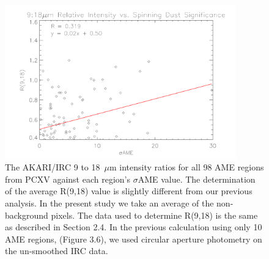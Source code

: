 \begin{figure}[!htb]
\label{fig:R918PlotB}
\centering
\includegraphics[angle=0,width=100mm]{EPS/IRCratio_vs_AMEsigma_betafix.pdf}
\caption{The AKARI/IRC 9 to 18~$\mu$m intensity ratios for all 98 AME regions from PCXV against each region's $\sigma$AME value. The determination of the average R(9,18) value is slightly different from our previous analysis. In the present study we take an average of the non-background pixels. The data used to determine R(9,18) is the same as described in Section 2.4. In the previous calculation using only 10 AME regions, (Figure 3.6), we used circular aperture photometry on the un-smoothed IRC data. }
\end{figure}

